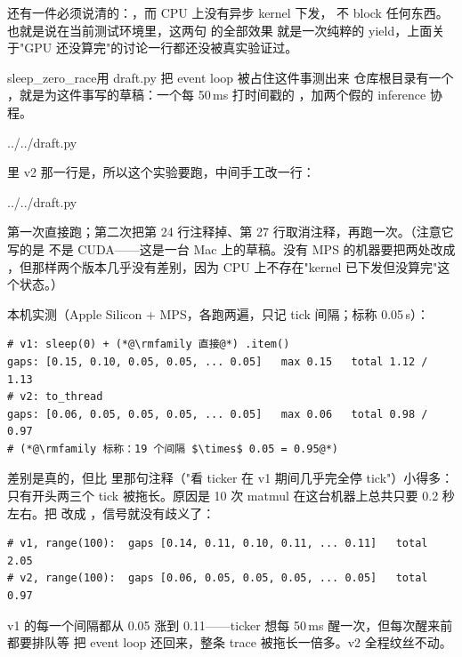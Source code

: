 还有一件必须说清的：，而 CPU 上没有异步 kernel 下发，
 不 block 任何东西。也就是说在当前测试环境里，这两句  的全部效果
就是一次纯粹的 yield，上面关于"GPU 还没算完"的讨论一行都还没被真实验证过。

\begin{examplebox}{sleep_zero_race}{用 draft.py 把 event loop 被占住这件事测出来}
仓库根目录有一个 ，就是为这件事写的草稿：一个每 50\,ms 打时间戳的
，加两个假的 inference 协程。

%
  {../../draft.py}

 里 v2 那一行是，所以这个实验要跑，中间手工改一行：

%
  {../../draft.py}

第一次直接跑；第二次把第 24 行注释掉、第 27 行取消注释，再跑一次。（注意它写的是
 不是 CUDA——这是一台 Mac 上的草稿。没有 MPS 的机器要把两处改成
，但那样两个版本几乎没有差别，因为 CPU 上不存在"kernel 已下发但没算完"这个状态。）

本机实测（Apple Silicon + MPS，各跑两遍，只记 tick 间隔；标称 0.05\,s）：

\begin{lstlisting}[style=hlrepl]
# v1: sleep(0) + (*@\rmfamily 直接@*) .item()
gaps: [0.15, 0.10, 0.05, 0.05, ... 0.05]   max 0.15   total 1.12 / 1.13
# v2: to_thread
gaps: [0.06, 0.05, 0.05, 0.05, ... 0.05]   max 0.06   total 0.98 / 0.97
# (*@\rmfamily 标称：19 个间隔 $\times$ 0.05 = 0.95@*)
\end{lstlisting}

差别是真的，但比  里那句注释（"看 ticker 在 v1 期间几乎完全停 tick"）小得多：
只有开头两三个 tick 被拖长。原因是 10 次 matmul 在这台机器上总共只要 0.2 秒左右。把
 改成 ，信号就没有歧义了：

\begin{lstlisting}[style=hlrepl]
# v1, range(100):  gaps [0.14, 0.11, 0.10, 0.11, ... 0.11]   total 2.05
# v2, range(100):  gaps [0.06, 0.05, 0.05, 0.05, ... 0.05]   total 0.97
\end{lstlisting}

v1 的每一个间隔都从 0.05 涨到 0.11——ticker 想每 50\,ms 醒一次，但每次醒来前都要排队等
 把 event loop 还回来，整条 trace 被拖长一倍多。v2 全程纹丝不动。


\end{examplebox}
